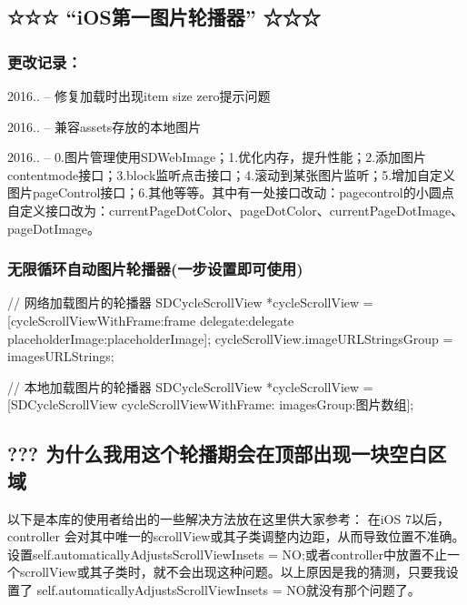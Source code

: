 \subsection*{☆☆☆ “i\+O\+S第一图片轮播器” ☆☆☆}

\subsubsection*{更改记录：}

2016.. -- 修复加载时出现item size zero提示问题

2016.. -- 兼容assets存放的本地图片

2016.. -- 0.图片管理使用\+S\+D\+Web\+Image；1.\+优化内存，提升性能；2.\+添加图片contentmode接口；3.\+block监听点击接口；4.\+滚动到某张图片监听；5.\+增加自定义图片page\+Control接口；6.\+其他等等。其中有一处接口改动：pagecontrol的小圆点自定义接口改为：current\+Page\+Dot\+Color、page\+Dot\+Color、current\+Page\+Dot\+Image、page\+Dot\+Image。

\subsubsection*{无限循环自动图片轮播器(一步设置即可使用)}

\begin{DoxyVerb} // 网络加载图片的轮播器
 SDCycleScrollView *cycleScrollView = [cycleScrollViewWithFrame:frame delegate:delegate placeholderImage:placeholderImage];
 cycleScrollView.imageURLStringsGroup = imagesURLStrings;

 // 本地加载图片的轮播器
 SDCycleScrollView *cycleScrollView = [SDCycleScrollView cycleScrollViewWithFrame: imagesGroup:图片数组];
\end{DoxyVerb}






\subsection*{??? 为什么我用这个轮播期会在顶部出现一块空白区域}

以下是本库的使用者给出的一些解决方法放在这里供大家参考： 在i\+OS 7以后，controller 会对其中唯一的scroll\+View或其子类调整内边距，从而导致位置不准确。设置self.\+automatically\+Adjusts\+Scroll\+View\+Insets = NO;或者controller中放置不止一个scroll\+View或其子类时，就不会出现这种问题。以上原因是我的猜测，只要我设置了 self.\+automatically\+Adjusts\+Scroll\+View\+Insets = N\+O就没有那个问题了。

